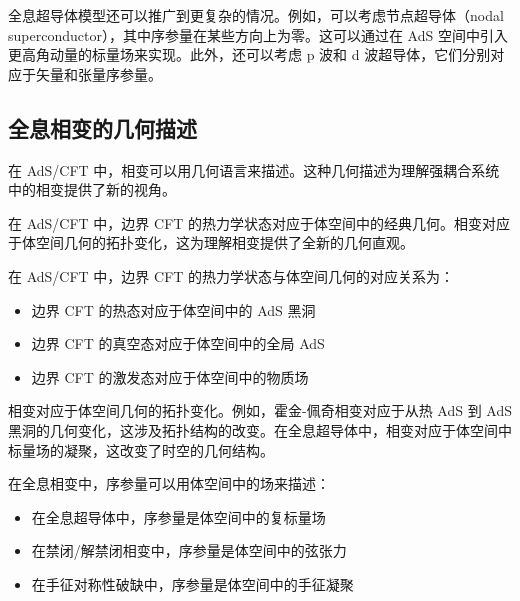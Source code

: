 \begin{remark}
全息超导体模型还可以推广到更复杂的情况。例如，可以考虑节点超导体（nodal superconductor），其中序参量在某些方向上为零。这可以通过在 AdS 空间中引入更高角动量的标量场来实现。此外，还可以考虑 p 波和 d 波超导体，它们分别对应于矢量和张量序参量。
\end{remark}

\subsection{全息相变的几何描述}

在 AdS/CFT 中，相变可以用几何语言来描述。这种几何描述为理解强耦合系统中的相变提供了新的视角。

\begin{note}
在 AdS/CFT 中，边界 CFT 的热力学状态对应于体空间中的经典几何。相变对应于体空间几何的拓扑变化，这为理解相变提供了全新的几何直观。
\end{note}

\begin{definition}[全息相变的几何对应]
在 AdS/CFT 中，边界 CFT 的热力学状态与体空间几何的对应关系为：
\begin{itemize}
    \item 边界 CFT 的热态对应于体空间中的 AdS 黑洞
    \item 边界 CFT 的真空态对应于体空间中的全局 AdS
    \item 边界 CFT 的激发态对应于体空间中的物质场
\end{itemize}
\end{definition}

\begin{remark}
相变对应于体空间几何的拓扑变化。例如，霍金-佩奇相变对应于从热 AdS 到 AdS 黑洞的几何变化，这涉及拓扑结构的改变。在全息超导体中，相变对应于体空间中标量场的凝聚，这改变了时空的几何结构。
\end{remark}

\begin{definition}[全息相变的序参量]
在全息相变中，序参量可以用体空间中的场来描述：
\begin{itemize}
    \item 在全息超导体中，序参量是体空间中的复标量场
    \item 在禁闭/解禁闭相变中，序参量是体空间中的弦张力
    \item 在手征对称性破缺中，序参量是体空间中的手征凝聚
\end{itemize}
\end{definition}

